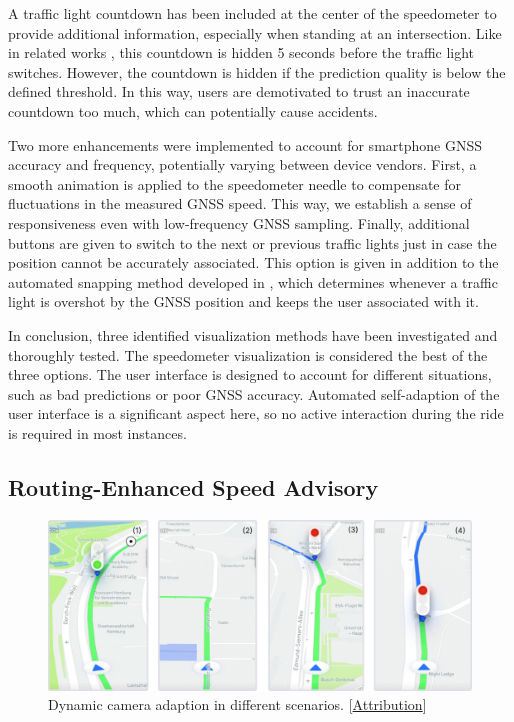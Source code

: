 A traffic light countdown has been included at the center of the speedometer to provide additional information, especially when standing at an intersection. Like in related works \cite{stahlmann_exploring_2018, sokolov_effects_2018}, this countdown is hidden 5 seconds before the traffic light switches. However, the countdown is hidden if the prediction quality is below the defined threshold. In this way, users are demotivated to trust an inaccurate countdown too much, which can potentially cause accidents.

Two more enhancements were implemented to account for smartphone GNSS accuracy and frequency, potentially varying between device vendors. First, a smooth animation is applied to the speedometer needle to compensate for fluctuations in the measured GNSS speed. This way, we establish a sense of responsiveness even with low-frequency GNSS sampling. Finally, additional buttons are given to switch to the next or previous traffic lights just in case the position cannot be accurately associated. This option is given in addition to the automated snapping method developed in , which determines whenever a traffic light is overshot by the GNSS position and keeps the user associated with it.

In conclusion, three identified visualization methods have been investigated and thoroughly tested. The speedometer visualization is considered the best of the three options. The user interface is designed to account for different situations, such as bad predictions or poor GNSS accuracy. Automated self-adaption of the user interface is a significant aspect here, so no active interaction during the ride is required in most instances.

\subsection{Routing-Enhanced Speed Advisory}

\begin{figure}[t]
\centering
\includegraphics[width=\linewidth]{images/camera-controller.pdf}
\caption{Dynamic camera adaption in different scenarios. [\hyperref[attribution]{Attribution}]}
\label{fig:camera-controller}
\end{figure}

